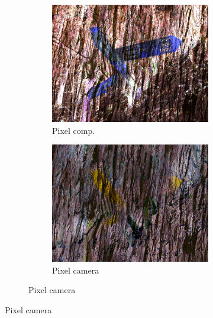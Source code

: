 \begin{figure}[]
\begin{subfigure}{\textwidth}
\begin{subfigure}{0.24\textwidth}
            \includegraphics[width=\textwidth]{images/04-experiment02/photo/wood/pixel_im.jpg}
            \caption*{Pixel comp.}
        \end{subfigure}
        \hfill
        \begin{subfigure}{0.24\textwidth}
            \centering
            \includegraphics[width=\textwidth]{images/04-experiment02/photo/wood/pixel_proj.jpg}
            \caption*{Pixel camera}
        \end{subfigure}


\end{subfigure}
\end{figure}
